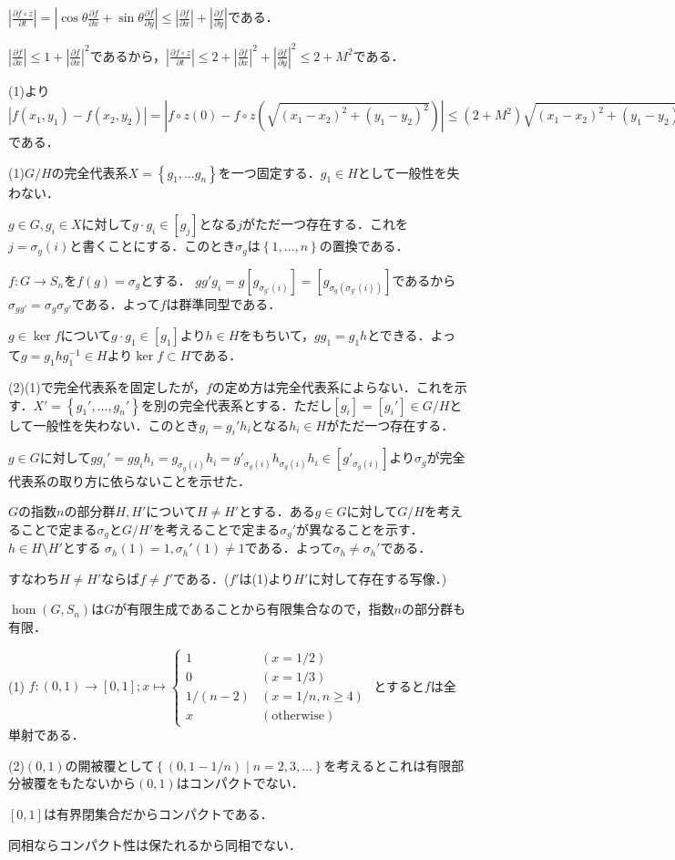\documentclass[
		book,
		head_space=20mm,
		foot_space=20mm,
		gutter=10mm,
		line_length=190mm
]{jlreq}
\begin{document}
$|\frac{\partial f\circ z}{\partial t}|=|\cos \theta\frac{\partial f}{\partial x}+\sin \theta\frac{\partial f}{\partial y}|\le |\frac{\partial f}{\partial x}|+|\frac{\partial f}{\partial y}|$である．

$|\frac{\partial f}{\partial x}| \le 1+|\frac{\partial f}{\partial x}|^2$であるから，$|\frac{\partial f\circ z}{\partial t}| \le 2+|\frac{\partial f}{\partial x}|^2+|\frac{\partial f}{\partial y}|^2 \le 2+M^2$である．

(1)より$|f(x_1,y_1)-f(x_2,y_2)|=|f\circ z(0) - f\circ z(\sqrt{(x_1-x_2)^2+(y_1-y_2)^2})|\le (2+M^2)\sqrt{(x_1-x_2)^2+(y_1-y_2)^2}$である．

(1)$G/H$の完全代表系$X=\left\{ g_1,\dots g_n \right\}$を一つ固定する．$g_1\in H$として一般性を失わない．

$g\in G,g_i\in X$に対して$g\cdot g_i \in [g_j]$となる$j$がただ一つ存在する．これを$j=\sigma_g(i)$と書くことにする．このとき$\sigma_g$は$\left\{ 1,\dots,n \right\}$の置換である．

$f\colon G\rightarrow S_n$を$f(g)=\sigma_g$とする．
$gg'g_i = g [g_{\sigma_{g'}(i)}]=[g_{\sigma_g(\sigma_{g'}(i))}]$であるから$\sigma_{gg'}=\sigma_g\sigma_{g'}$である．よって$f$は群準同型である．

$g \in \ker f $について$g\cdot g_1 \in [g_1]$より$h \in H$をもちいて，$gg_1=g_1h$とできる．よって$g = g_1hg_1^{-1}\in H$より$\ker f \subset H$である．

(2)(1)で完全代表系を固定したが，$f$の定め方は完全代表系によらない．これを示す．$X'=\left\{ g_1',\dots,g_n' \right\}$を別の完全代表系とする．ただし$[g_i]=[g_i']\in G/H$として一般性を失わない．このとき$g_i=g_i'h_i$となる$h_i\in H$がただ一つ存在する．

$g \in G$に対して$gg_i'=gg_ih_i=g_{\sigma_g(i)}h_i=g'_{\sigma_g(i)}h_{\sigma_g(i)}h_i\in[g'_{\sigma_g(i)}]$より$\sigma_g$が完全代表系の取り方に依らないことを示せた．

$G$の指数$n$の部分群$H,H'$について$H\neq H'$とする．ある$g\in G$に対して$G/H$を考えることで定まる$\sigma_g$と$G/H'$を考えることで定まる$\sigma_g'$が異なることを示す．
$h \in H \setminus H'$とする
$\sigma_h(1)=1,\sigma_h'(1)\neq 1$である．よって$\sigma_h\neq \sigma_h'$である．

すなわち$H\neq H'$ならば$f\neq f'$である．($f'$は(1)より$H'$に対して存在する写像．)

$\hom(G,S_n)$は$G$が有限生成であることから有限集合なので，指数$n$の部分群も有限．

(1) $f\colon (0,1)\rightarrow [0,1];x\mapsto \begin{cases}
    1 & (x=1/2)\\
    0 & (x=1/3)\\
    1/(n-2) & (x=1/n,n\ge 4)\\
    x & (\text{otherwise})
\end{cases}$
とすると$f$は全単射である．

(2)$(0,1)$の開被覆として$\left\{ (0,1-1/n) \mid n=2,3,\dots\right\}$を考えるとこれは有限部分被覆をもたないから$(0,1)$はコンパクトでない．

$[0,1]$は有界閉集合だからコンパクトである．

同相ならコンパクト性は保たれるから同相でない．
\end{document}
